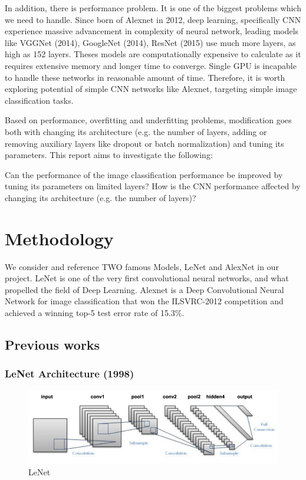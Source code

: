 \documentclass[journal,onecolumn, 12pt]{IEEEtran}
\begin{document}
In addition, there is performance problem. It is one of the biggest problems which we need to handle. Since born of Alexnet in 2012, deep learning, specifically CNN experience massive advancement in complexity of neural network, leading models like VGGNet (2014), GoogleNet (2014), ResNet (2015) use much more layers, as high as 152 layers. Theses models are computationally expensive to calculate as it requires extensive memory and longer time to converge. Single GPU is incapable to handle these networks in reasonable amount of time. Therefore, it is worth exploring potential of simple CNN networks like Alexnet, targeting simple image classification tasks. 

Based on performance, overfitting and underfitting problems, modification goes both with changing its architecture (e.g. the number of layers, adding or removing auxiliary layers like dropout or batch normalization) and tuning its parameters. This report aims to investigate the following:

Can the performance of the image classification performance be improved by tuning its parameters on limited layers?
How is the CNN performance affected by changing its architecture (e.g. the number of layers)?

\section{Methodology}
We consider and reference TWO famous Models, LeNet and AlexNet in our project. LeNet is one of the very first convolutional neural networks, and what propelled the field of Deep Learning. Alexnet is a Deep Convolutional Neural Network for image classification that won the ILSVRC-2012 competition and achieved a winning top-5 test error rate of 15.3\%. 

\subsection{Previous works}
\subsubsection{LeNet Architecture (1998)}

\begin{figure}[!t]
\includegraphics[width=0.8\paperwidth]{images/lenet}
\caption{LeNet}
\end{figure}
\end{document}
